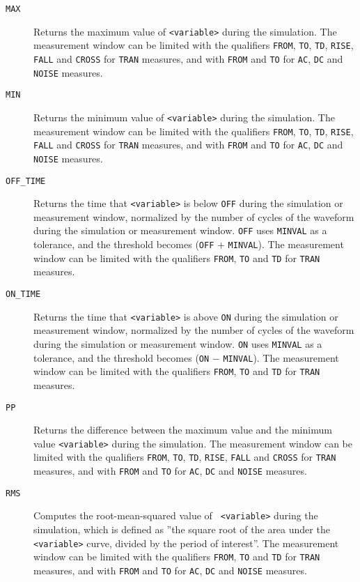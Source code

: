\begin{Command}
\begin{Arguments}
\begin{description}
  \item[\tt MAX] Returns the maximum value of {\tt <variable>} during
    the simulation.  The measurement window can be limited with the
    qualifiers {\tt FROM}, {\tt TO}, {\tt TD}, {\tt RISE}, {\tt FALL}
    and {\tt CROSS} for {\tt TRAN} measures, and with {\tt FROM} and
    {\tt TO} for {\tt AC}, {\tt DC} and {\tt NOISE} measures.

  \item[\tt MIN] Returns the minimum value of {\tt <variable>} during
    the simulation.  The measurement window can be limited with the
    qualifiers {\tt FROM}, {\tt TO}, {\tt TD}, {\tt RISE}, {\tt FALL}
    and {\tt CROSS} for {\tt TRAN} measures, and with {\tt FROM} and
    {\tt TO} for {\tt AC}, {\tt DC} and {\tt NOISE} measures.

  \item[\tt OFF\_TIME] Returns the time that {\tt <variable>} is below
    {\tt OFF} during the simulation or measurement window, normalized
    by the number of cycles of the waveform during the simulation or
    measurement window.  {\tt OFF} uses {\tt MINVAL} as a tolerance,
    and the threshold becomes ({\tt OFF} $+$ {\tt MINVAL}).  The
    measurement window can be limited with the qualifiers {\tt FROM},
    {\tt TO} and {\tt TD} for {\tt TRAN} measures.

  \item[\tt ON\_TIME] Returns the time that {\tt <variable>} is above
    {\tt ON} during the simulation or measurement window, normalized
    by the number of cycles of the waveform during the simulation or
    measurement window.  {\tt ON} uses {\tt MINVAL} as a tolerance,
    and the threshold becomes ({\tt ON} $-$ {\tt MINVAL}).  The
    measurement window can be limited with the qualifiers {\tt FROM},
    {\tt TO} and {\tt TD} for {\tt TRAN} measures.

  \item[\tt PP] Returns the difference between the maximum value and
    the minimum value {\tt <variable>} during the simulation. The
    measurement window can be limited with the qualifiers {\tt FROM},
    {\tt TO}, {\tt TD}, {\tt RISE}, {\tt FALL} and {\tt CROSS} for
    {\tt TRAN} measures, and with {\tt FROM} and {\tt TO} for {\tt AC},
    {\tt DC} and {\tt NOISE} measures.

  \item[\tt RMS] Computes the root-mean-squared value of {\tt
    <variable>} during the simulation, which is defined as ''the
    square root of the area under the {\tt <variable>} curve, divided by
    the period of interest''.  The measurement window can be
    limited with the qualifiers {\tt FROM}, {\tt TO} and {\tt TD} for
    {\tt TRAN} measures, and with {\tt FROM} and {\tt TO} for {\tt AC},
    {\tt DC} and {\tt NOISE} measures.


\end{description}
\end{Arguments}
\end{Command}
